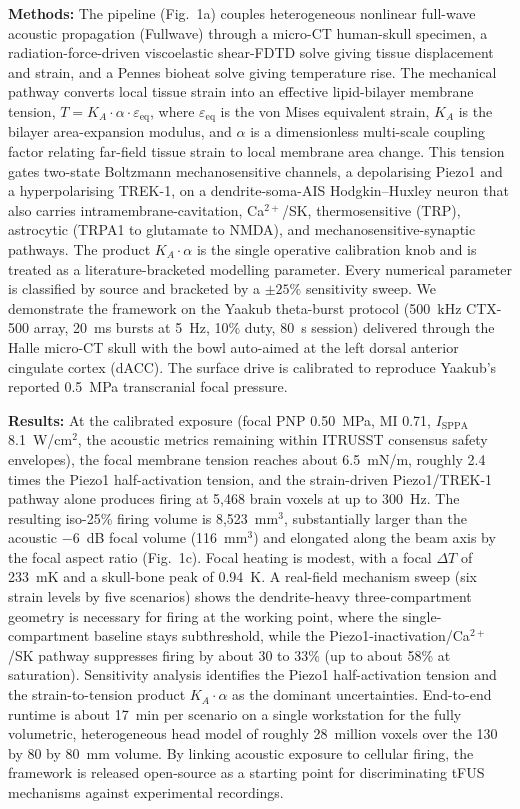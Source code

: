 \documentclass[10pt]{article}
\begin{document}
\textbf{Methods:} The pipeline (Fig.~1a) couples heterogeneous nonlinear full-wave
acoustic propagation (Fullwave) through a micro-CT human-skull specimen, a
radiation-force-driven viscoelastic shear-FDTD solve giving tissue displacement and
strain, and a Pennes bioheat solve giving temperature rise. The mechanical pathway
converts local tissue strain into an effective lipid-bilayer membrane tension,
$T = K_A \cdot \alpha \cdot \varepsilon_\mathrm{eq}$, where $\varepsilon_\mathrm{eq}$ is
the von Mises equivalent strain, $K_A$ is the bilayer area-expansion modulus, and
$\alpha$ is a dimensionless multi-scale coupling factor relating far-field tissue strain
to local membrane area change. This tension gates two-state Boltzmann mechanosensitive
channels, a depolarising Piezo1 and a hyperpolarising TREK-1, on a dendrite-soma-AIS
Hodgkin--Huxley neuron that also carries intramembrane-cavitation, Ca$^{2+}$/SK,
thermosensitive (TRP), astrocytic (TRPA1 to glutamate to NMDA), and
mechanosensitive-synaptic pathways. The product $K_A \cdot \alpha$ is the single
operative calibration knob and is treated as a literature-bracketed modelling parameter.
Every numerical parameter is classified by source and bracketed by a $\pm 25\%$
sensitivity sweep. We demonstrate the framework on the Yaakub theta-burst protocol
(500~kHz CTX-500 array, 20~ms bursts at 5~Hz, 10\% duty, 80~s session) delivered through
the Halle micro-CT skull with the bowl auto-aimed at the left dorsal anterior cingulate
cortex (dACC). The surface drive is calibrated to reproduce Yaakub's reported 0.5~MPa
transcranial focal pressure.

\textbf{Results:} At the calibrated exposure (focal PNP 0.50~MPa, MI 0.71,
$I_\mathrm{SPPA}$ 8.1~W/cm$^2$, the acoustic metrics remaining within ITRUSST consensus
safety envelopes), the focal membrane tension reaches about 6.5~mN/m, roughly 2.4 times
the Piezo1 half-activation tension, and the strain-driven Piezo1/TREK-1 pathway alone
produces firing at 5,468 brain voxels at up to 300~Hz. The resulting iso-25\% firing
volume is 8,523~mm$^3$, substantially larger than the acoustic $-6$~dB focal volume
(116~mm$^3$) and elongated along the beam axis by the focal aspect ratio (Fig.~1c). Focal
heating is modest, with a focal $\Delta T$ of 233~mK and a skull-bone peak of 0.94~K. A
real-field mechanism sweep (six strain levels by five scenarios) shows the dendrite-heavy
three-compartment geometry is necessary for firing at the working point, where the
single-compartment baseline stays subthreshold, while the
Piezo1-inactivation/Ca$^{2+}$/SK pathway suppresses firing by about 30 to 33\% (up to
about 58\% at saturation). Sensitivity analysis identifies the Piezo1 half-activation
tension and the strain-to-tension product $K_A \cdot \alpha$ as the dominant
uncertainties. End-to-end runtime is about 17~min per scenario on a single workstation
for the fully volumetric, heterogeneous head model of roughly 28~million voxels over the
130 by 80 by 80~mm volume. By linking acoustic exposure to cellular firing, the framework
is released open-source as a starting point for discriminating tFUS mechanisms against
experimental recordings.
\end{document}
